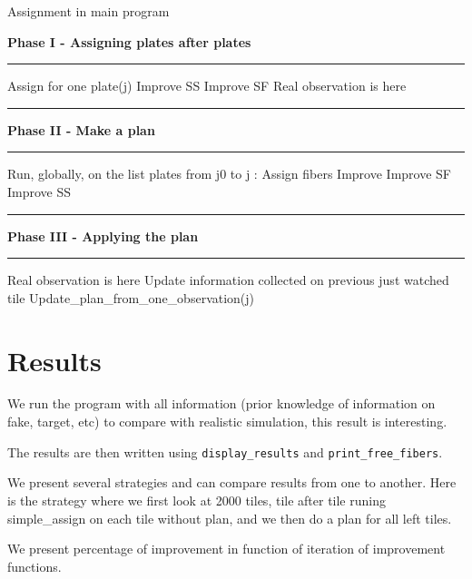 \documentclass[10pt]{extarticle}
\newcommand\Algphasee[1]{%
\Statex\hspace*{-\algorithmicindent}\textbf{#1}%
\vspace*{-.7\baselineskip}\Statex\hspace*{\dimexpr-\algorithmicindent-2pt\relax}\rule{\textwidth}{0.4pt}%
}
\newcommand\Algphase[1]{%
\vspace*{-.7\baselineskip}\Statex\hspace*{\dimexpr-\algorithmicindent-2pt\relax}\rule{\textwidth}{0.4pt}%
\Statex\hspace*{-\algorithmicindent}\textbf{#1}%
\vspace*{-.7\baselineskip}\Statex\hspace*{\dimexpr-\algorithmicindent-2pt\relax}\rule{\textwidth}{0.4pt}%
}
\begin{document}
\begin{multicols}{2}
\begin{algorithm}[H]
	\caption{Assignment in main program}\label{euclid}
	\begin{algorithmic}[1]
		\Algphasee{Phase I - Assigning plates after plates}
		\State Assign for one plate(j)
		\State Improve SS
		\State Improve SF
		\State Real observation is here
		\EndFor
	\end{algorithmic}

	\begin{algorithmic}[1]
		\Algphase{Phase II - Make a plan}
		\State Run, globally, on the list plates from j0 to j :
		\State Assign fibers
		\State Improve
		\State Improve SF
		\State Improve SS
	\end{algorithmic}

	\begin{algorithmic}[1]
		\Algphase{Phase III - Applying the plan}
		\State Real observation is here
		\State Update information collected on previous just watched tile
		\State Update\_plan\_from\_one\_observation(j)
		\EndFor
	\end{algorithmic}
\end{algorithm}

\section{Results}
We run the program with all information (prior knowledge of information on fake, target, etc) to compare with realistic simulation, this result is interesting.

The results are then written using {\tt display\_results} and {\tt print\_free\_fibers}.

We present several strategies and can compare results from one to another. Here is the strategy where we first look at 2000 tiles, tile after tile runing simple\_assign on each tile without plan, and we then do a plan for all left tiles.

We present percentage of improvement in function of iteration of improvement functions.
 

\end{multicols}
\end{document}
